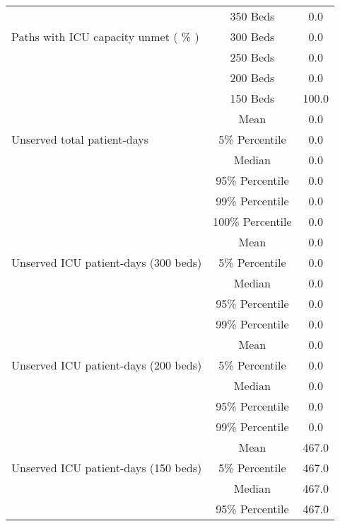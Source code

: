 \documentclass{article}
\begin{document}
\begin{table}[!htb]
\begin{tabular}{p{4cm}cc}
\multirow{3}{\hsize}{Paths with ICU capacity unmet ( \% )}  &  350 Beds    &         0.0      \\ \cmidrule(l){2-3}
&  300 Beds    &         0.0              \\ \cmidrule(l){2-3}
&   250 Beds   &         0.0               \\ \cmidrule(l){2-3}
&   200 Beds   &        0.0               \\ \cmidrule(l){2-3}
&   150 Beds   &         100.0                       \\   \midrule 
\multirow{3}{\hsize}{Unserved total patient-days} & Mean & 0.0  \\ \cmidrule(l){2-3}
									& 5\% Percentile     & 0.0    \\ \cmidrule(l){2-3}
									& Median & 0.0  \\ \cmidrule(l){2-3}  
									& 95\% Percentile     & 0.0       \\ \cmidrule(l){2-3} 
									& 99\% Percentile     & 0.0         \\ \cmidrule(l){2-3} 
									& 100\% Percentile     & 0.0      \\   \midrule 
\multirow{3}{\hsize}{Unserved ICU patient-days (300 beds)} & Mean & 0.0  \\ \cmidrule(l){2-3}
									& 5\% Percentile     & 0.0    \\ \cmidrule(l){2-3} 
									& Median & 0.0  \\ \cmidrule(l){2-3} 
									& 95\% Percentile     & 0.0    \\ \cmidrule(l){2-3} 
									& 99\% Percentile     & 0.0   \\  \midrule  							
\multirow{3}{\hsize}{Unserved ICU patient-days (200 beds)} & Mean & 0.0  \\ \cmidrule(l){2-3}
& 5\% Percentile     & 0.0    \\ \cmidrule(l){2-3} 
& Median & 0.0  \\ \cmidrule(l){2-3} 
& 95\% Percentile     & 0.0    \\ \cmidrule(l){2-3} 
& 99\% Percentile     & 0.0          \\ \midrule
\multirow{3}{\hsize}{Unserved ICU patient-days (150 beds)} & Mean & 467.0  \\ \cmidrule(l){2-3}
& 5\% Percentile     & 467.0    \\ \cmidrule(l){2-3} 
& Median & 467.0  \\ \cmidrule(l){2-3} 
& 95\% Percentile     & 467.0    \\ \cmidrule(l){2-3} 

\end{tabular}
\end{table}
\end{document}
